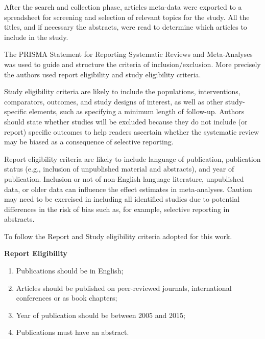 After the search and collection phase, articles meta-data were exported to a spreadsheet for screening and selection of relevant topics for the study.
All the titles, and if necessary the abstracts, were read to determine which articles to include in the study.

The PRISMA Statement for Reporting Systematic Reviews and Meta-Analyses\cite{liberati_prisma_2009} was used to guide and structure the criteria of inclusion/exclusion.
More precisely the authors used report eligibility and study eligibility criteria.

Study eligibility criteria are likely to include the populations, interventions, comparators, outcomes, and study designs of interest, as well as other study-specific elements, such as specifying a minimum length of follow-up. Authors should state whether studies will be excluded because they do not include (or report) specific outcomes to help readers ascertain whether the systematic review may be biased as a consequence of selective reporting\cite{liberati_prisma_2009}.

Report eligibility criteria are likely to include language of publication, publication status (e.g., inclusion of unpublished material and abstracts), and year of publication. Inclusion or not of non-English language literature, unpublished data, or older data can influence the effect estimates in meta-analyses. Caution may need to be exercised in including all identified studies due to potential differences in the risk of bias such as, for example, selective reporting in abstracts\cite{liberati_prisma_2009}.

To follow the Report and Study eligibility criteria adopted for this work.

\medskip

\textbf{Report Eligibility}
\begin{enumerate}
\item Publications should be in English;
\item Articles should be published on peer-reviewed journals, international conferences or as book chapters;
\item Year of publication should be between 2005 and 2015;
\item Publications must have an abstract.
\end{enumerate}

\medskip

